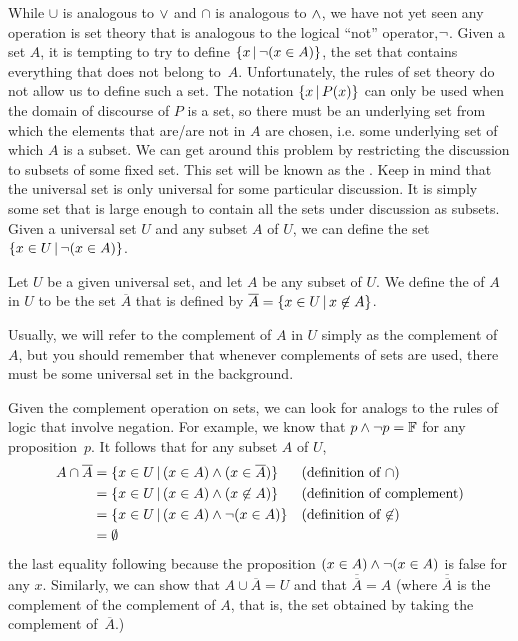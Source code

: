 \medbreak

While $\cup$ is analogous to $\vee$ and $\cap$ is analogous to
$\wedge$, we have not yet seen any operation is set theory that
is analogous to the logical ``not'' operator,$\lnot$.  Given a
set $A$, it is tempting to try to define $\{x\,|\, \lnot(x\in A)\}$,
the set that contains everything that does not belong to~$A$. 
Unfortunately, the rules of set theory do not allow us to define 
such a set.  The notation $\{x\,|\, P(x)\}$ can only be used when
the domain of discourse of $P$ is a set, so there must be an underlying
set from which the elements that are/are not in $A$ are chosen,
i.e. some underlying set of which $A$ is a subset.  We can get around
this problem by restricting the discussion to subsets of
some fixed set.  This set will be known as the .
Keep in mind that the universal set is only universal for some
particular discussion.  It is simply some set that is large 
enough to contain all the sets under discussion as subsets.
Given a universal set $U$ and any subset $A$ of $U$,
we can define the set $\{x\in U\,|\, \lnot(x\in A)\}$.

\begin{definition}
Let $U$ be a given universal set, and let $A$ be any subset
of $U$.  We define the  of $A$ in $U$ to be the
set $\overline{A}$ that is defined by $\overline{A}=\{x\in U\,|\, x\not\in A\}$.
\end{definition}

Usually, we will refer to the complement of $A$ in $U$ simply as
the complement of $A$, but you should remember that whenever complements
of sets are used, there must be some universal set in the background.

Given the complement operation on sets, we can look for
analogs to the rules of logic that involve negation.
For example, we know that $p\wedge\lnot p=\mathbb{F}$ for any
proposition~$p$.  It follows that for any subset $A$ of $U$,
\begin{align*}
A\cap\overline{A} &= \{x\in U\,|\, (x\in A)\wedge (x\in \overline{A})\}
                        &&\text{(definition of $\cap$)}\\
                  &= \{x\in U\,|\, (x\in A)\wedge (x\not\in A)\}
                        &&\text{(definition of complement)}\\
                  &= \{x\in U\,|\, (x\in A)\wedge \lnot(x\in A)\}
                        &&\text{(definition of $\not\in$)}\\
                  &= \emptyset
\end{align*}
the last equality following because the proposition $(x\in A)\wedge \lnot(x\in A)$ is false for
any $x$.  Similarly, we can show that
$A\cup\overline{A}=U$ and that $\overline{\overline{A}}=A$
(where $\overline{\overline{A}}$ is the complement of the
complement of $A$, that is, the set obtained by taking the
complement of~$\overline{A}$.)

